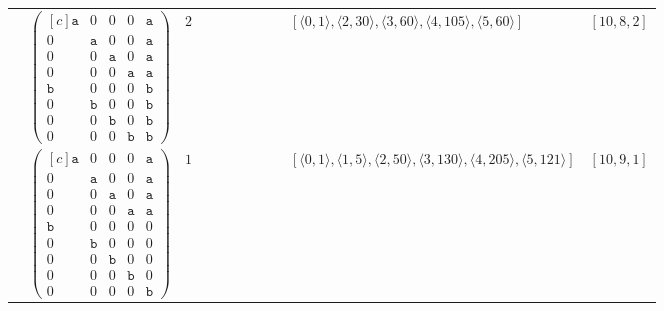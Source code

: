 \documentclass[12pt]{article}
\theoremstyle{definition}
\theoremstyle{plain}
\begin{document}
{\begin{longtable}{@{}cYcccccccZc@{}}
& $\begin{pmatrix*}[c]
\mathtt{a}  &  0  &  0  &  0  &  \mathtt{a}  \\
0  &  \mathtt{a}  &  0  &  0  &  \mathtt{a}  \\
0  &  0  &  \mathtt{a}  &  0  &  \mathtt{a}  \\
0  &  0  &  0  &  \mathtt{a}  &  \mathtt{a}  \\
\mathtt{b}  &  0  &  0  &  0  &  \mathtt{b}  \\
0  &  \mathtt{b}  &  0  &  0  &  \mathtt{b}  \\
0  &  0  &  \mathtt{b}  &  0  &  \mathtt{b}  \\
0  &  0  &  0  &  \mathtt{b}  &  \mathtt{b}
\end{pmatrix*}$
& $2$
&
&
&
&
&
&
& $[\langle0,1\rangle,\allowbreak\langle2,30\rangle,\allowbreak\langle3,60\rangle,\allowbreak\langle4,105\rangle,\allowbreak\langle5,60\rangle]$
& $[10,8,2]$     \\

\cmidrule(lr){2-11}


& $\begin{pmatrix*}[c]
\mathtt{a}  &  0  &  0  &  0  &  \mathtt{a}  \\
0  &  \mathtt{a}  &  0  &  0  &  \mathtt{a}  \\
0  &  0  &  \mathtt{a}  &  0  &  \mathtt{a}  \\
0  &  0  &  0  &  \mathtt{a}  &  \mathtt{a}  \\
\mathtt{b}  &  0  &  0  &  0  &  0  \\
0  &  \mathtt{b}  &  0  &  0  &  0  \\
0  &  0  &  \mathtt{b}  &  0 &  0   \\
0  &  0  &  0  &  \mathtt{b}  &  0  \\
0  &  0  &  0  &  0  &  \mathtt{b}
\end{pmatrix*}$
& $1$
&
&
&
&
&
&
& $[\langle0,1\rangle,\allowbreak\langle1,5\rangle,\allowbreak\langle2,50\rangle,\allowbreak\langle3,130\rangle,\allowbreak\langle4,205\rangle,\allowbreak\langle5,121\rangle]$
& $[10,9,1]$\\

\cmidrule(lr){2-11}


\end{longtable}}
\end{document}
